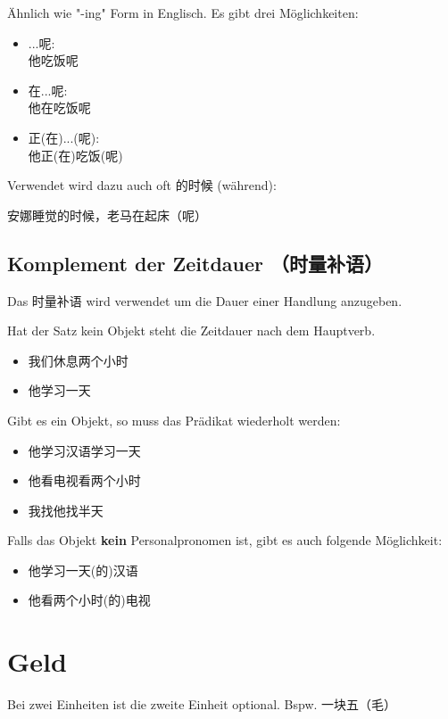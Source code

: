 \documentclass[UTF8]{ctexart}
\begin{document}
Ähnlich wie "-ing" Form in Englisch. Es gibt drei Möglichkeiten:

\begin{itemize}
    \item ...呢:\\他吃饭呢
    \item 在...呢:\\他在吃饭呢
    \item 正(在)...(呢):\\他正(在)吃饭(呢)
\end{itemize}

Verwendet wird dazu auch oft 的时候 (während):

安娜睡觉的时候，老马在起床（呢）

\subsection{Komplement der Zeitdauer （时量补语）}

Das 时量补语 wird verwendet um die Dauer einer Handlung anzugeben.

Hat der Satz kein Objekt steht die Zeitdauer nach dem Hauptverb.

\begin{itemize}
    \item 我们休息两个小时
    \item 他学习一天
\end{itemize}

Gibt es ein Objekt, so muss das Prädikat wiederholt werden:

\begin{itemize}
    \item 他学习汉语学习一天
    \item 他看电视看两个小时
    \item 我找他找半天
\end{itemize}

Falls das Objekt \textbf{kein} Personalpronomen ist, gibt es auch folgende Möglichkeit:

\begin{itemize}
    \item 他学习一天(的)汉语
    \item 他看两个小时(的)电视
\end{itemize}

\section{Geld}

Bei zwei Einheiten ist die zweite Einheit optional. Bspw. 一块五（毛）
\end{document}
